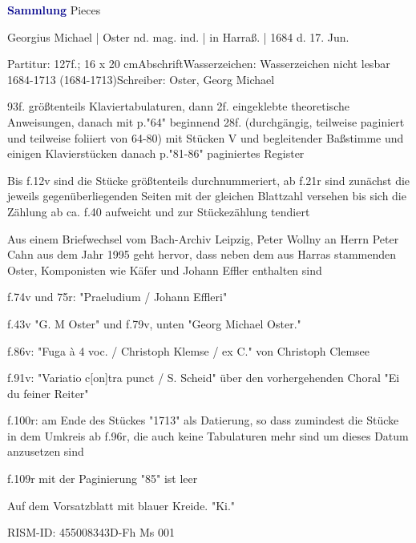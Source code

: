 \documentclass[twocolumn]{book}
\begin{document}
\par \vspace{7pt} \textcolor{darkblue}{\textbf{Sammlung}} Pieces
\par \begin{itshape} Georgius Michael | Oster nd. mag. ind. | in Harraß. | 1684 d. 17. Jun.\end{itshape} 
\par \textcolor{darkblue}{}  Partitur: 127f.; 16 x 20 cm\newline Abschrift\newline Wasserzeichen: Wasserzeichen nicht lesbar  1684-1713 (1684-1713)\newline Schreiber: Oster, Georg Michael
\par 93f. größtenteils Klaviertabulaturen, dann 2f. eingeklebte theoretische Anweisungen, danach mit p."64" beginnend 28f. (durchgängig, teilweise paginiert und teilweise foliiert von 64-80) mit Stücken V und begleitender Baßstimme und einigen Klavierstücken danach p."81-86" paginiertes Register
\par Bis f.12v sind die Stücke größtenteils durchnummeriert, ab f.21r sind zunächst die jeweils gegenüberliegenden Seiten mit der gleichen Blattzahl versehen bis sich die Zählung ab ca. f.40 aufweicht und zur Stückezählung tendiert
\par Aus einem Briefwechsel vom Bach-Archiv Leipzig, Peter Wollny an Herrn Peter Cahn aus dem Jahr 1995 geht hervor, dass neben dem aus Harras stammenden Oster, Komponisten wie Käfer und Johann Effler enthalten sind
\par f.74v und 75r: "Praeludium / Johann Effleri"
\par f.43v "G. M Oster" und f.79v, unten "Georg Michael Oster."
\par f.86v: "Fuga à 4 voc. / Christoph Klemse / ex C." von Christoph Clemsee
\par f.91v: "Variatio c[on]tra punct / S. Scheid" über den vorhergehenden Choral "Ei du feiner Reiter"
\par f.100r: am Ende des Stückes "1713" als Datierung, so dass zumindest die Stücke in dem Umkreis ab f.96r, die auch keine Tabulaturen mehr sind um dieses Datum anzusetzen sind
\par f.109r mit der Paginierung "85" ist leer
\par Auf dem Vorsatzblatt mit blauer Kreide. "Ki."
\par RISM-ID: 455008343\newline D-Fh  Ms 001
\end{document}
